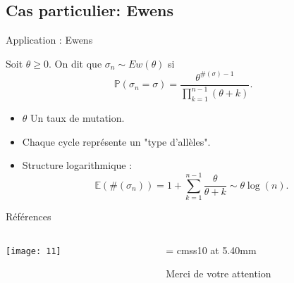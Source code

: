 \documentclass[french]{beamer}
\begin{document}
\subsection{Cas particulier: Ewens} 
\begin{frame}{Application : Ewens}
\begin{definition}
Soit $\theta\geq 0$. On dit que $\sigma_n\sim Ew(\theta)$ si  
\begin{equation*}
\mathbb{P}(\sigma_n=\sigma)=\frac{\theta^{\#(\sigma)-1}}{\prod_{k=1}^{n-1}(\theta+k)}.\end{equation*}
\end{definition}
\begin{itemize}
\item $\theta$ Un taux de mutation.
\item  Chaque cycle représente un "type d'allèles". 
\item Structure logarithmique : $$\mathbb{E}(\#(\sigma_n))= 1+\sum_{k=1}^{n-1} \frac{\theta}{\theta+k}\sim \theta \log(n).$$
\end{itemize}
\end{frame}
\begin{frame}{Références}
\tiny


    

\end{frame}
\begin{frame}

  \begin{columns}
    \begin{column}{0.70\textwidth}
      \begin{center}
        \texttt{[image: 11]}          
      \end{center}
    \end{column}
    \begin{column}{0.30\textwidth}
      \begin{center}

        \font\endfont = cmss10 at 5.40mm
\color[rgb]{0.00,0.00,1.00}       \endfont 
        \baselineskip 7.0mm

        Merci de votre attention

      \end{center}    

    \end{column}
  \end{columns}

\end{frame}
\end{document}
